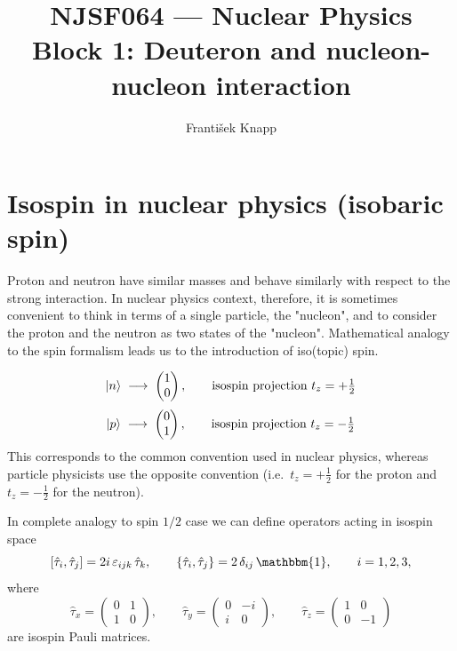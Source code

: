 \documentclass[11pt,a4paper]{article}
\title{NJSF064 --- Nuclear Physics\\[2mm]\large Block 1: Deuteron and nucleon-nucleon interaction}
\author{František Knapp}
\date{}
\newcommand{\op}[1]{\hat{#1}}
\begin{document}
\maketitle


\section{Isospin in nuclear physics (isobaric spin)}
Proton and neutron have similar masses and behave similarly with respect to the strong interaction. In nuclear physics context, therefore, it is sometimes convenient to think in terms of a single particle, the "nucleon", and to consider the proton and the neutron as two states of the "nucleon". Mathematical analogy to the spin formalism leads us to the introduction of iso(topic) spin.

\[
\ket{n} \;\longrightarrow\; \begin{pmatrix}1\\0\end{pmatrix},
\qquad \text{isospin projection } t_z = +\tfrac12 
\]
\[
\ket{p} \;\longrightarrow\; \begin{pmatrix}0\\1\end{pmatrix},
\qquad  \text{isospin projection } t_z = -\tfrac12 
\]
This corresponds to the common convention used in nuclear physics, whereas particle physicists use the opposite convention (i.e.\ $t_z = +\tfrac12$ for the proton and $t_z = -\tfrac12$ for the neutron).

In complete analogy to spin $1/2$ case we can define operators acting in isospin space
\[        
[\op\tau_i,\op\tau_j] = 2i\,\varepsilon_{ijk}\,\op\tau_k ,
\qquad
\{\op\tau_i,\op\tau_j\} = 2\,\delta_{ij}\,\mathbbm{1},
\qquad i=1,2,3 ,
\]
where 
\[
\op\tau_x=\begin{pmatrix}0&1\\1&0\end{pmatrix},\qquad
\op\tau_y=\begin{pmatrix}0&-i\\ i&0\end{pmatrix},\qquad
\op\tau_z=\begin{pmatrix}1&0\\0&-1\end{pmatrix}
\]
are isospin Pauli matrices. 
\end{document}
